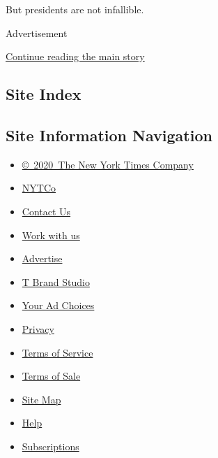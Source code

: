 But presidents are not infallible.

Advertisement

\protect\hyperlink{after-bottom}{Continue reading the main story}

\hypertarget{site-index}{%
\subsection{Site Index}\label{site-index}}

\hypertarget{site-information-navigation}{%
\subsection{Site Information
Navigation}\label{site-information-navigation}}

\begin{itemize}
\tightlist
\item
  \href{https://help.nytimes3xbfgragh.onion/hc/en-us/articles/115014792127-Copyright-notice}{©~2020~The
  New York Times Company}
\end{itemize}

\begin{itemize}
\tightlist
\item
  \href{https://www.nytco.com/}{NYTCo}
\item
  \href{https://help.nytimes3xbfgragh.onion/hc/en-us/articles/115015385887-Contact-Us}{Contact
  Us}
\item
  \href{https://www.nytco.com/careers/}{Work with us}
\item
  \href{https://nytmediakit.com/}{Advertise}
\item
  \href{http://www.tbrandstudio.com/}{T Brand Studio}
\item
  \href{https://www.nytimes3xbfgragh.onion/privacy/cookie-policy\#how-do-i-manage-trackers}{Your
  Ad Choices}
\item
  \href{https://www.nytimes3xbfgragh.onion/privacy}{Privacy}
\item
  \href{https://help.nytimes3xbfgragh.onion/hc/en-us/articles/115014893428-Terms-of-service}{Terms
  of Service}
\item
  \href{https://help.nytimes3xbfgragh.onion/hc/en-us/articles/115014893968-Terms-of-sale}{Terms
  of Sale}
\item
  \href{https://spiderbites.nytimes3xbfgragh.onion}{Site Map}
\item
  \href{https://help.nytimes3xbfgragh.onion/hc/en-us}{Help}
\item
  \href{https://www.nytimes3xbfgragh.onion/subscription?campaignId=37WXW}{Subscriptions}
\end{itemize}

